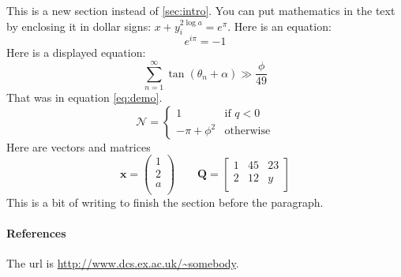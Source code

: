 \documentclass[11pt]{article}
\newcommand{\bQ}{\mathbf{Q}}
\begin{document}
This is a new section instead of \ref{sec:intro}.  You can put mathematics
in the text by enclosing it in dollar signs: $x+y_i^{2 \log a} = e^\pi$.
Here is an equation:
\begin{equation}
  \label{eq:new}
  e^{i\pi} = -1
\end{equation}
Here is a displayed equation:
\begin{equation}
  \label{eq:demo}
  \sum_{n=1}^\infty \tan(\theta_n + \alpha) \gg \frac{\phi}{49}
\end{equation}
That was in equation \eqref{eq:demo}.
\begin{equation}
  \label{eq:cases}
  \mathcal{N} = 
  \begin{cases}
    1  & \text{if } q < 0\\
    -\pi + \phi^2 &  \text{otherwise}
  \end{cases}
\end{equation}
Here are vectors and matrices
\begin{equation}
  \label{eq:matrices}
  \mathbf{x} = 
  \begin{pmatrix}
    1 \\
    2 \\
    a \\
  \end{pmatrix}
  \qquad
  \bQ = 
  \begin{bmatrix}
    1 & 45 & 23 \\
    2 & 12 & y \\
  \end{bmatrix}
\end{equation}
This is a bit of writing to finish the section before the paragraph.


\paragraph{References}

The url is \url{http://www.dcs.ex.ac.uk/~somebody}.
\end{document}
